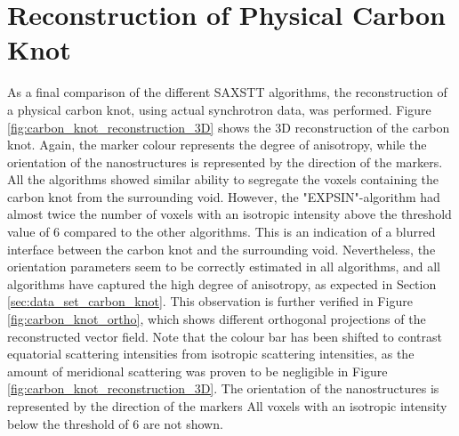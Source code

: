 \clearpage
\section{Reconstruction of Physical Carbon Knot}\label{sec:reconstruction_physical_carbon_knot}

As a final comparison of the different SAXSTT algorithms, the reconstruction of a physical carbon knot, using actual synchrotron data, was performed.
Figure \ref{fig:carbon_knot_reconstruction_3D} shows the 3D reconstruction of the carbon knot.
Again, the marker colour represents the degree of anisotropy, while the orientation of the nanostructures is represented by the direction of the markers.
All the algorithms showed similar ability to segregate the voxels containing the carbon knot from the surrounding void.
However, the "EXPSIN"-algorithm had almost twice the number of voxels with an isotropic intensity above the threshold value of 6 compared to the other algorithms.
This is an indication of a blurred interface between the carbon knot and the surrounding void.
Nevertheless, the orientation parameters seem to be correctly estimated in all algorithms,
and all algorithms have captured the high degree of anisotropy, as expected in Section \ref{sec:data_set_carbon_knot}.
This observation is further verified in Figure \ref{fig:carbon_knot_ortho}, which shows different orthogonal projections of the reconstructed vector field.
Note that the colour bar has been shifted to contrast equatorial scattering intensities from isotropic scattering intensities,
as the amount of meridional scattering was proven to be negligible in Figure \ref{fig:carbon_knot_reconstruction_3D}.
The orientation of the nanostructures is represented by the direction of the markers
All voxels with an isotropic intensity below the threshold of 6 are not shown.

\clearpage

